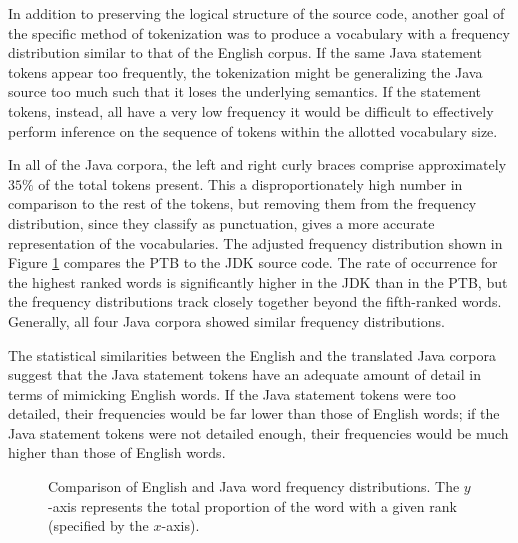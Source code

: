 \documentclass[runningheads,a4paper]{llncs}
\begin{document}
In addition to preserving the logical structure of the source code,
another goal of the specific method of tokenization was to
produce a vocabulary with a frequency distribution similar to that of
the English corpus. If the same
Java statement tokens appear too frequently, the tokenization might be
generalizing the Java source too much such that it loses the underlying
semantics. If the statement tokens, instead, all have a very low frequency
it would be difficult to effectively perform inference on the sequence of 
tokens within the allotted vocabulary size.

In all of the Java corpora, the left and right curly braces comprise
approximately $35\%$
of the total tokens present. This a disproportionately high number in
comparison to the rest of the tokens, but removing them from the frequency
distribution, since they classify as punctuation, gives a more accurate
representation of the vocabularies. The adjusted frequency distribution
shown in Figure \ref{english-frequency} compares the PTB to the
JDK source code. The rate of occurrence for the highest
ranked words is significantly higher in the JDK than in the PTB, but
the frequency distributions track closely together beyond the fifth-ranked
words.
Generally, all four Java corpora showed similar frequency distributions.

The statistical similarities between the English and the translated Java
corpora suggest that the Java statement tokens have an adequate amount of
detail in terms of mimicking English words. If the Java statement tokens
were too detailed, their frequencies would be far lower than those of English
words; if the Java statement tokens were not detailed enough, their
frequencies would be much higher than those of English words.

\begin{figure}
\centering
{} 
\caption{Comparison of English and Java word frequency distributions.
    The $y$-axis represents the total proportion of the word with a given
    rank (specified by the $x$-axis).}
\label{english-frequency}
\end{figure}
 
\end{document}
